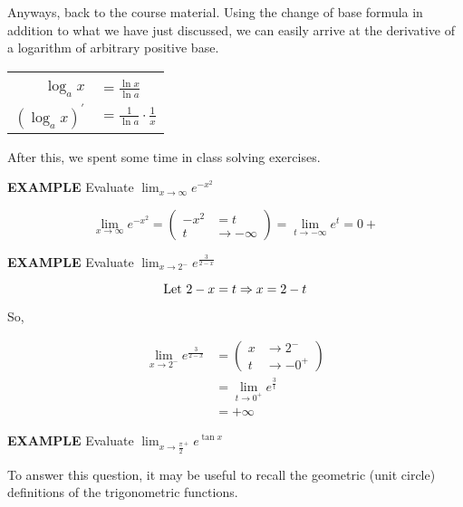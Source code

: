 \documentclass{article}
\begin{document}
\vspace{10pt}

Anyways, back to the course material. Using the change of base formula in addition to what we have just discussed, we can easily arrive at the derivative of a logarithm of arbitrary positive base.

\begin{center}
\begin{tabular}{|rl|}
\hline&\\
$\log_ax$ & $=\frac{\ln x}{\ln a}$\\[0.5em]
$(\log_ax)^\prime$ & $=\frac{1}{\ln a}\cdot\frac{1}{x}$\\[1em]
\hline
\end{tabular}
\end{center}

After this, we spent some time in class solving exercises.

\vspace{10pt}

{\bf{}EXAMPLE} Evaluate $\displaystyle\lim_{x\to\infty}e^{-x^2}$

\[\lim_{x\to\infty}e^{-x^2}=\left(\begin{array}{rl}-x^2&=t\\t&\to-\infty\end{array}\right)=\lim_{t\to-\infty}e^t=0+\]

\vspace{10pt}

{\bf{}EXAMPLE} Evaluate $\displaystyle\lim_{x\to2^-}e^\frac{3}{2-x}$

\[\textnormal{Let }2-x=t\Rightarrow x=2-t\]

So,

\begin{align*}
\lim_{x\to2^-}e^\frac{3}{2-x}&=\left(\begin{array}{rl}x&\to2^-\\t&\to-0^+\end{array}\right)\\
&=\lim_{t\to0^+}e^\frac{3}{t}\\
&=+\infty
\end{align*}

{\bf{}EXAMPLE} Evaluate $\displaystyle\lim_{x\to\frac{\pi}{2}^+}e^{\tan x}$

\vspace{10pt}

To answer this question, it may be useful to recall the geometric (unit circle) definitions of the trigonometric functions.
\end{document}

